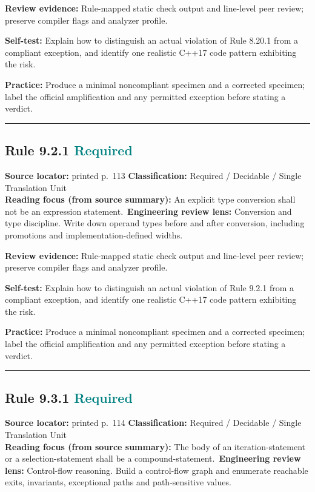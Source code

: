 \documentclass[10pt,letterpaper]{article}
\begin{document}
\textbf{Review evidence:} Rule-mapped static check output and line-level peer review; preserve compiler flags and analyzer profile.

\textbf{Self-test:} Explain how to distinguish an actual violation of Rule 8.20.1 from a compliant exception, and identify one realistic C++17 code pattern exhibiting the risk.\par
\textbf{Practice:} Produce a minimal noncompliant specimen and a corrected specimen; label the official amplification and any permitted exception before stating a verdict.
\smallskip\hrule\smallskip
\subsection*{Rule 9.2.1 \enspace \texorpdfstring{\small\textcolor{teal}{Required}}{Required}}
\noindent\textbf{Source locator:} printed p.~113 \quad\textbf{Classification:} Required / Decidable / Single Translation Unit\\
\textbf{Reading focus (from source summary):} An explicit type conversion shall not be an expression statement.\
\textbf{Engineering review lens:} Conversion and type discipline. Write down operand types before and after conversion, including promotions and implementation-defined widths.

\textbf{Review evidence:} Rule-mapped static check output and line-level peer review; preserve compiler flags and analyzer profile.

\textbf{Self-test:} Explain how to distinguish an actual violation of Rule 9.2.1 from a compliant exception, and identify one realistic C++17 code pattern exhibiting the risk.\par
\textbf{Practice:} Produce a minimal noncompliant specimen and a corrected specimen; label the official amplification and any permitted exception before stating a verdict.
\smallskip\hrule\smallskip
\subsection*{Rule 9.3.1 \enspace \texorpdfstring{\small\textcolor{teal}{Required}}{Required}}
\noindent\textbf{Source locator:} printed p.~114 \quad\textbf{Classification:} Required / Decidable / Single Translation Unit\\
\textbf{Reading focus (from source summary):} The body of an iteration-statement or a selection-statement shall be a compound-statement.\
\textbf{Engineering review lens:} Control-flow reasoning. Build a control-flow graph and enumerate reachable exits, invariants, exceptional paths and path-sensitive values.
\end{document}
